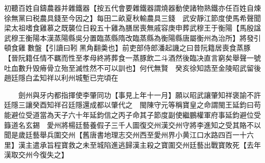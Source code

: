 初聽百姓自鑄農器并雜鐵器【按五代會要雜鐵器謂燒器動使諸物熟鐵亦任百姓自煉徐無黨曰税農具錢至今因之】每田二畝夏秋輸農具三錢　武安靜江節度使馬希聲聞梁太祖嗜食雞慕之既襲位日殺五十雞為膳居喪無戚容庚申葬武穆王于衡陽【馬殷諡武穆王衡陽本漢蒸陽縣吳分置臨蒸縣隋改臨蒸縣為衡陽縣唐屬衡州為治所】將發引頓食雞數盤【引讀曰靷黑角翻羮也】前吏部侍郎潘起譏之曰昔阮籍居喪食蒸豚【晉阮籍任情不羈而性至孝母終將葬食一蒸豚飲二斗酒然後臨决直言窮矣舉聲一號吐血數升毁瘠骨立殆至滅性然不可以訓也】何代無賢　癸亥徐知誥至金陵昭武留後趙廷隱白孟知祥以利州城塹已完頃在

　　劍州與牙内都指揮使李肇同功【事見上年十一月】願以昭武讓肇知祥褒諭不許廷隱三讓癸酉知祥召廷隱還成都以肇代之　閩陳守元等稱寶皇之命謂閩王延鈞曰苟能避位受道當為天子六十年延鈞信之丙子命其子節度副使繼鵬權軍府事延鈞避位受籙道名玄錫　愛州將楊廷藝養假子三千人圖復交州漢交州守將李進知之受其賂不以聞是歲廷藝舉兵圍交州【舊唐書地理志交州西至愛州界小黄江口水路四百一十六里】漢主遣承旨程寶救之未至城陷進逃歸漢主殺之寶圍交州廷藝出戰寶敗死【去年漢取交州今復失之】

